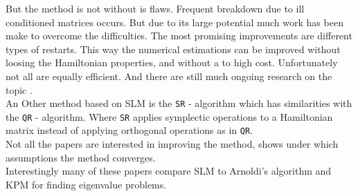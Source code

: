 But the method is not without is flaws. Frequent breakdown due to ill conditioned matrices occurs\cite{1}. But due to its large potential much work has been make to overcome the difficulties. The most promising improvements are different types of restarts. This way the numerical estimations can be improved without loosing the Hamiltonian properties, and without a to high cost. %
Unfortunately not all are equally efficient. And there are still much ongoing research on the topic \cite{1,2,3}. \\

An Other method based on SLM is the \texttt{SR} - algorithm which has similarities with the \texttt{QR} - algorithm. Where \texttt{SR} applies symplectic operations to a Hamiltonian matrix instead of applying orthogonal operations as in \texttt{QR}. \\

Not all the papers are interested in improving the method, \cite{4} shows under which assumptions the method converges. \\

Interestingly many of these papers \cite{3, avsluttning} compare SLM to Arnoldi's algorithm and KPM for finding eigenvalue problems.

%
%
%
%

